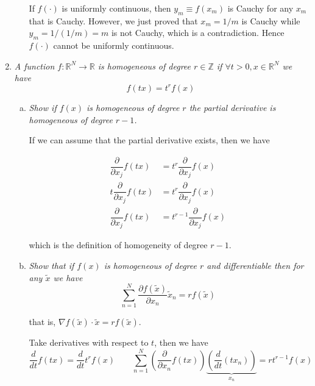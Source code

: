 \documentclass{article}
\begin{document}
\begin{enumerate}[1.]
\begin{enumerate}[a)]
        \solution If $f(\cdot)$ is uniformly continuous, then $y_m \equiv f(x_m)$ is Cauchy for any $x_m$ that is Cauchy. However, we just proved that $x_m = 1 / m$ is Cauchy while $y_m = 1 / (1 / m) = m$ is not Cauchy, which is a contradiction. Hence $f(\cdot)$ cannot be uniformly continuous.
    \end{enumerate}

  \item {\itshape
    A function $f: \mathbb{R}^N \to \mathbb{R}$ is homogeneous of degree $r \in \mathbb{Z}$ if $\forall t > 0, x \in \mathbb{R}^N$ we have
    \[
      f(tx) = t^r f(x)
    \]
    }

    \begin{enumerate}[a)]
      \item \textit{Show if $f(x)$ is homogeneous of degree $r$ the partial derivative is homogeneous of degree $r - 1$.}

        \solution If we can assume that the partial derivative exists, then we have

        \begin{align*}
          \dfrac{\partial}{\partial x_j} f(tx) & = t^r \dfrac{\partial}{\partial x_j} f(x)
          \\
          t \dfrac{\partial}{\partial x_j} f(tx) & = t^r \dfrac{\partial}{\partial x_j} f(x)
          \\
          \dfrac{\partial}{\partial x_j} f(tx) & = t^{r - 1} \dfrac{\partial}{\partial x_j} f(x)
        \end{align*}

        which is the definition of homogeneity of degree $r - 1$.

      \item {\itshape
          Show that if $f(x)$ is homogeneous of degree $r$ and differentiable  then for any $\widetilde{x}$ we have
        \[
          \sum^{N}_{n = 1} \dfrac{\partial f(\widetilde{x})}{\partial x_n} \widetilde{x}_n = r f(\widetilde{x})
        \]

        that is, $\nabla f(\widetilde{x}) \cdot \widetilde{x} = r f(\widetilde{x})$.}

      \solution Take derivatives with respect to $t$, then we have
        \[
          \dfrac{d}{dt} f(tx)
            = \dfrac{d}{dt} t^r f(x)
          \quad\quad
          \sum^{N}_{n = 1}
          \left(\dfrac{\partial}{\partial x_n} f(tx)\right)
          \underbrace{\left(\dfrac{d}{dt} (t x_n)\right)}_{x_n}
            = r t^{r - 1} f(x)
        \]


\end{enumerate}
\end{enumerate}
\end{document}
